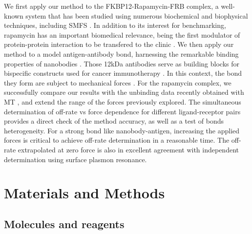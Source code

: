 \documentclass{biophys-new}
\begin{document}
We first apply our method to the FKBP12-Rapamycin-FRB complex, a well-known system that has been studied using numerous biochemical \cite{chen1995, leone2006, tao2010} and biophysical \cite{banaszynski2005, flaxman2019, tamura2013, lu2017, choi1996, aylett2016} techniques, including SMFS \cite{kostrz2019, wang2019}. In addition to its interest for benchmarking, rapamycin has an important biomedical relevance, being the first modulator of protein-protein interaction to be transfered to the clinic \cite{martelli2018, li2014}. We then apply our method to a model antigen-antibody bond, harnessing the remarkable binding properties of nanobodies \cite{chames2020}. Those 12kDa antibodies serve as building blocks for bispecific constructs used for cancer immunotherapy \cite{turini2014}. In this context, the bond they form are subject to mechanical forces \cite{gonzalez2019}. For the rapamycin complex, we successfully compare our results with the unbinding data recently obtained with MT \cite{kostrz2019, wang2019}, and extend the range of the forces previously explored. The simultaneous determination of off-rate vs force dependence for different ligand-receptor pairs provides a direct check of the method accuracy, as well as a test of bonds heterogeneity. For a strong bond like nanobody-antigen, increasing the applied forces is critical to achieve off-rate determination in a reasonable time. The off-rate extrapolated at zero force is also in excellent agreement with independent determination using surface plasmon resonance. %

\section*{Materials and Methods}



\subsection*{Molecules and reagents}


\end{document}
